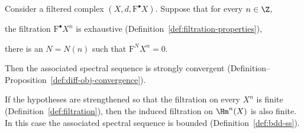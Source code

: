 \begin{theorem}\label{prop:classical-convergence}
	Consider a filtered complex $(X,d,\mathrm{F}^\bullet X)$. Suppose that for
	every $n\in\Z$,
	\begin{compactitem}
		\item the filtration $\mathrm{F}^\bullet X^n$ is exhaustive
		(Definition~\ref{def:filtration-properties}),
		\item there is an $N=N(n)$ such that $\mathrm{F}^NX^n=0$.
	\end{compactitem}
	Then the associated spectral sequence is strongly convergent
	(Definition--Proposition~\ref{def:diff-obj-convergence}).

	If the hypotheses are strengthened so that the filtration on every $X^n$
	is finite (Definition~\ref{def:filtration}), then the induced filtration on
	$\Hm^n(X)$ is also finite. In this case the associated spectral sequence is
	bounded (Definition~\ref{def:bdd-ss}).
\end{theorem}
